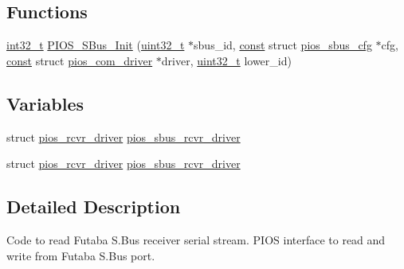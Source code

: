 \subsection*{Functions}
\begin{DoxyCompactItemize}
\item 
\hyperlink{group___n_a_m_e_gafd12020da5a235dfcf0c3c748fb5baed}{int32\-\_\-t} \hyperlink{group___p_i_o_s___s_bus_gac93988726d12e4481b1ae236ab5fc8f5}{P\-I\-O\-S\-\_\-\-S\-Bus\-\_\-\-Init} (\hyperlink{stdint_8h_a435d1572bf3f880d55459d9805097f62}{uint32\-\_\-t} $\ast$sbus\-\_\-id, \hyperlink{group___n_a_m_e_ga7ae6d0e43244213b34de2c2b9aa30da6}{const} struct \hyperlink{structpios__sbus__cfg}{pios\-\_\-sbus\-\_\-cfg} $\ast$cfg, \hyperlink{group___n_a_m_e_ga7ae6d0e43244213b34de2c2b9aa30da6}{const} struct \hyperlink{structpios__com__driver}{pios\-\_\-com\-\_\-driver} $\ast$driver, \hyperlink{stdint_8h_a435d1572bf3f880d55459d9805097f62}{uint32\-\_\-t} lower\-\_\-id)
\end{DoxyCompactItemize}
\subsection*{Variables}
\begin{DoxyCompactItemize}
\item 
struct \hyperlink{structpios__rcvr__driver}{pios\-\_\-rcvr\-\_\-driver} \hyperlink{group___p_i_o_s___s_bus_gaaeb5483a0eaa4e4221011d4a83831876}{pios\-\_\-sbus\-\_\-rcvr\-\_\-driver}
\item 
struct \hyperlink{structpios__rcvr__driver}{pios\-\_\-rcvr\-\_\-driver} \hyperlink{group___p_i_o_s___s_bus_gaaeb5483a0eaa4e4221011d4a83831876}{pios\-\_\-sbus\-\_\-rcvr\-\_\-driver}
\end{DoxyCompactItemize}


\subsection{Detailed Description}
Code to read Futaba S.\-Bus receiver serial stream. P\-I\-O\-S interface to read and write from Futaba S.\-Bus port.

